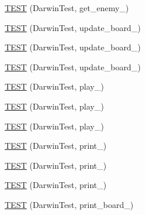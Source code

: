 \begin{DoxyCompactItemize}
\hyperlink{TestDarwin_8c_09_09_a762f2dc5ecb9ea9fb6fabc523fbff441}{T\-E\-S\-T} (Darwin\-Test, get\-\_\-enemy\-\_)
\item 
\hyperlink{TestDarwin_8c_09_09_af341b46a53a50c6031006808771526bb}{T\-E\-S\-T} (Darwin\-Test, update\-\_\-board\-\_)
\item 
\hyperlink{TestDarwin_8c_09_09_abbcc4ba971ebc76297940485be74473c}{T\-E\-S\-T} (Darwin\-Test, update\-\_\-board\-\_)
\item 
\hyperlink{TestDarwin_8c_09_09_ae118d041f4bc0e1db58245ae15464b43}{T\-E\-S\-T} (Darwin\-Test, update\-\_\-board\-\_)
\item 
\hyperlink{TestDarwin_8c_09_09_ad3ced72cfac46653da781017a5e53aeb}{T\-E\-S\-T} (Darwin\-Test, play\-\_)
\item 
\hyperlink{TestDarwin_8c_09_09_aa6feefed2f0584bb3f1c092776fcedc3}{T\-E\-S\-T} (Darwin\-Test, play\-\_)
\item 
\hyperlink{TestDarwin_8c_09_09_ac3618a857ef16d72200fc1c8178bc6b4}{T\-E\-S\-T} (Darwin\-Test, play\-\_)
\item 
\hyperlink{TestDarwin_8c_09_09_ade0cb5f230ba5d761e102a4acd4146bc}{T\-E\-S\-T} (Darwin\-Test, print\-\_)
\item 
\hyperlink{TestDarwin_8c_09_09_ad4b1965b7df6c94ce3894d17c0bd97ec}{T\-E\-S\-T} (Darwin\-Test, print\-\_)
\item 
\hyperlink{TestDarwin_8c_09_09_aaef95df9319f9da416b4dc9b54073758}{T\-E\-S\-T} (Darwin\-Test, print\-\_)
\item 
\hyperlink{TestDarwin_8c_09_09_a7cc975748a64138e1db5dfdf552f7b9c}{T\-E\-S\-T} (Darwin\-Test, print\-\_\-board\-\_)
\end{DoxyCompactItemize}


